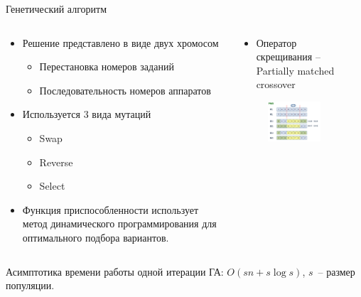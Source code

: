 \documentclass{beamer}
\begin{document}
\begin{frame}{Генетический алгоритм}
\begin{columns}[onlytextwidth,t]
    \begin{column}{0.6\textwidth}
        \begin{itemize}
            \item Решение представлено в виде двух хромосом
            \begin{itemize}
            \item Перестановка номеров заданий
            \item Последовательность номеров аппаратов
            \end{itemize}

            \item Используется 3 вида мутаций
            \begin{itemize}
            \item Swap
            \item Reverse
            \item Select
            \end{itemize}

            \item Функция приспособленности использует метод динамического программирования для оптимального подбора вариантов.
            \linebreak
        \end{itemize}

    \end{column}
    \begin{column}{0.4\textwidth}
        \begin{itemize}
            \item Оператор скрещивания -- Partially matched crossover
        \end{itemize}
        \begin{figure}[here]
            \includegraphics[scale=0.5]{images/300px-Pmx.png}
        \end{figure}
    \end{column}

​\end{columns}
Асимптотика времени работы одной итерации ГА: $O(sn + s\log s)$, $s$~-- размер популяции.
\end{frame}
\end{document}
